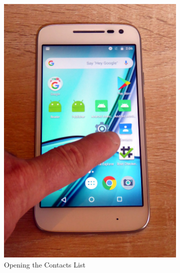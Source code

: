 \begin{figure}[h!]
	\centering
	\begin{subfigure}{0.49\textwidth}
	  \centering
      \includegraphics[height=0.45\textheight]{graphics/PhonePhotos/02 - BringUpContacts.jpg}
      \caption{Opening the Contacts List}
      \label{fig:OpeningContacts}
	\end{subfigure}
\hfill	
	\begin{subfigure}{0.49\textwidth}
		\centering

\end{subfigure}
\end{figure}
